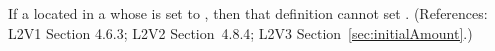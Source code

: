 If a \Species located in a \Compartment whose  is
set to , then that \Species definition cannot set
.  (References: L2V1 Section 4.6.3; L2V2
Section~4.8.4; L2V3 Section~\ref{sec:initialAmount}.)
